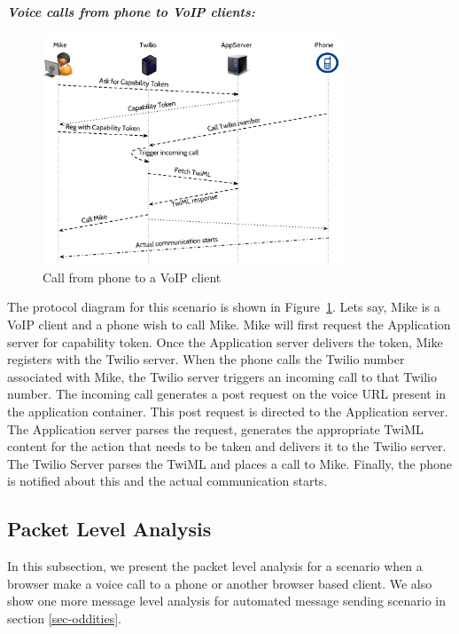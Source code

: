 \emph{\textbf{Voice calls from phone to VoIP clients:} }
\begin{figure}[t!] 
\centering
  \includegraphics[width=0.8\textwidth]{figs/p2c.pdf}
\caption{Call from phone to a VoIP client}
\label{fig:callfromphone}
\end{figure}
The protocol diagram for this scenario is shown in Figure~\ref{fig:callfromphone}. Lets say, Mike is a VoIP client and a phone wish to call Mike. Mike will first request the Application server for capability token. Once the Application server delivers the token, Mike registers with the Twilio server. When the phone calls the Twilio number associated with Mike, the Twilio server triggers an incoming call to that Twilio number. The incoming call generates a post request on the voice URL present in the application container. This post request is directed to the Application server. The Application server parses the request, generates the appropriate TwiML content for the action that needs to be taken and delivers it to the Twilio server. The Twilio Server parses the TwiML and places a call to Mike. Finally, the phone is notified about this and the actual communication starts.

\subsection{Packet Level Analysis}
In this subsection, we present the packet level analysis for a scenario when a browser make a voice call to a phone or another browser based client. We also show one more message level analysis for automated message sending scenario in section \ref{sec-oddities}. 

